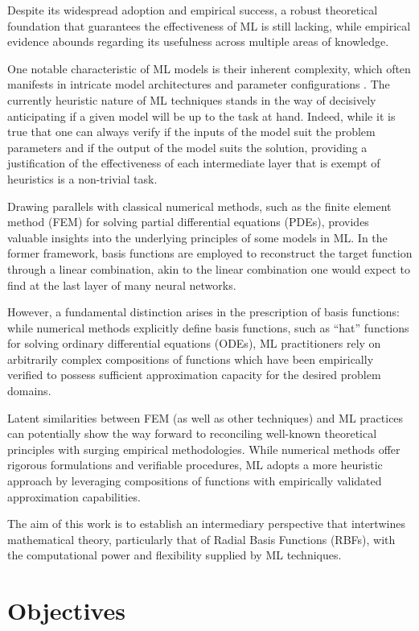 \documentclass[12pt]{report} %
\begin{document}
Despite its widespread adoption and empirical success, a robust theoretical foundation that
guarantees the effectiveness of ML is still lacking, while empirical evidence abounds
regarding its usefulness across multiple areas of knowledge.

One notable characteristic of ML models is their inherent complexity, which often manifests
in intricate model architectures and parameter configurations \cite{cuomo2022scientific}.
The currently heuristic nature of ML techniques stands in the way of decisively
anticipating if a given model will be up to the task at hand.
Indeed, while it is true that one can always verify if the inputs of
the model suit the problem parameters and if the output of the model suits the solution,
providing a justification of the effectiveness of each intermediate layer that is
exempt of heuristics is a non-trivial task.

Drawing parallels with classical numerical methods, such as the finite element method (FEM) for
solving partial differential equations (PDEs), provides valuable insights into the underlying
principles of some models in ML. In the former framework,
basis functions are employed to
reconstruct the target function through a linear combination, akin to the linear combination
one would expect to find at the last layer of many neural networks.

However, a fundamental distinction arises in the
prescription of basis functions: while numerical methods explicitly define basis functions,
such as ``hat'' functions for solving ordinary differential equations (ODEs), ML practitioners
rely on arbitrarily complex compositions of functions which have been empirically verified
to possess sufficient approximation capacity for the desired problem domains.

Latent similarities between FEM (as well as other techniques) and ML practices
can potentially show the way forward to reconciling well-known theoretical principles with
surging empirical methodologies. While numerical
methods offer rigorous formulations and verifiable procedures, ML adopts a more heuristic
approach by leveraging compositions of functions with empirically validated approximation
capabilities.

The aim of this work is to establish an intermediary perspective that intertwines
mathematical theory, particularly that of Radial Basis Functions (RBFs), with the
computational power and flexibility supplied by ML techniques.


\section{Objectives}
\end{document}
